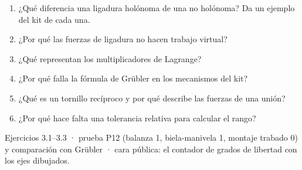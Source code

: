 \documentclass[11pt,a4paper]{article}
\begin{document}
\begin{control}
\begin{enumerate}[leftmargin=*]
  \item ¿Qué diferencia una ligadura holónoma de una no holónoma? Da un ejemplo del kit de cada una.
  \item ¿Por qué las fuerzas de ligadura no hacen trabajo virtual?
  \item ¿Qué representan los multiplicadores de Lagrange?
  \item ¿Por qué falla la fórmula de Grübler en los mecanismos del kit?
  \item ¿Qué es un tornillo recíproco y por qué describe las fuerzas de una unión?
  \item ¿Por qué hace falta una tolerancia relativa para calcular el rango?
\end{enumerate}
\end{control}

\begin{cierre}
Ejercicios 3.1--3.3 · prueba P12 (balanza 1, biela-manivela 1, montaje trabado 0) y comparación con Grübler · cara
pública: el contador de grados de libertad con los ejes dibujados.
\end{cierre}
\end{document}
